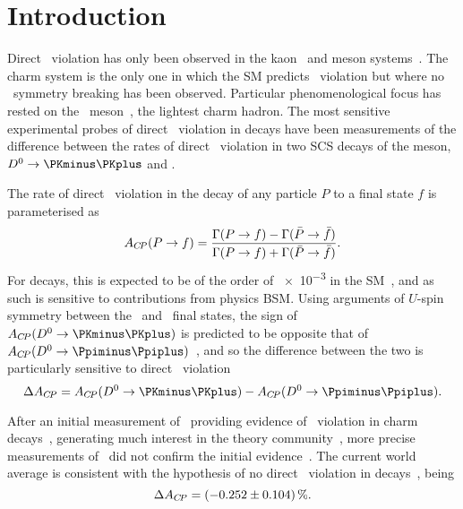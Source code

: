 \chapter{Introduction}
\label{chap:cpv:introduction}

Direct \CP\ violation has only been observed in the
kaon~\cite{Christenson:1964fg,Batley:2002gn} and \PB meson
systems~\cite{Aubert:2001nu,Abe:2001xe,Aaij:2012kz,Aaij:2013iua}.
The charm system is the only one in which the \ac{SM} predicts \CP\ violation
but where no \CP\ symmetry breaking has been observed.
Particular phenomenological focus has rested on the \PDzero\
meson~\cite{Grossman:2006jg}, the lightest charm hadron.
The most sensitive experimental probes of direct \CP\ violation in \PDzero
decays have been measurements of the difference between the rates of direct
\CP\ violation in two \ac{SCS} decays of the \PDzero meson,
$\decay{\PDzero}{\KmKp}$ and \pimpip.

The rate of direct \CP\ violation in the decay of any particle $P$ to a final
state $f$ is parameterised as
\begin{equation}
  \ACP(\decay{P}{f}) = \frac{%
    \Gamma(\decay{P}{f}) - \Gamma(\decay{\bar{P}}{\bar{f}})
  }{%
    \Gamma(\decay{P}{f}) + \Gamma(\decay{\bar{P}}{\bar{f}})
  }.
  \label{eqn:cpv:introduction:acp}
\end{equation}
For \decay{\PDzero}{\hmhp} decays, this is expected to be of the order of
\num{e-3} in the \ac{SM}~\cite{Grossman:2006jg}, and as such is sensitive to
contributions from physics \acl{BSM}.
Using arguments of $U$-spin symmetry between the \KmKp\ and \pimpip\ final
states, the sign of $\ACP(\decay{\PDzero}{\KmKp})$ is predicted to be opposite
that of $\ACP(\decay{\PDzero}{\pimpip})$~\cite{Grossman:2006jg}, and so the
difference between the two is particularly sensitive to direct \CP\ violation
\begin{equation}
  \dACP = \ACP(\decay{\PDzero}{\KmKp}) - \ACP(\decay{\PDzero}{\pimpip}).
  \label{eqn:cpv:introduction:dacp_pure}
\end{equation}

After an initial measurement of \dACP\ providing evidence of \CP\ violation in
charm decays~\cite{Aaij:2011in,Lenz:2013pwa}, generating much interest in the
theory community~\cite{Lenz:2013pwa}, more precise measurements of \dACP\ did
not confirm the initial evidence~\cite{Aaij:2014gsa,Aaij:2016cfh}.
The current world average is consistent with the hypothesis of no direct \CP\
violation in \PDzero decays~\cite{Amhis:2014hma}, being\footnotemark
\begin{equation}
  \dACP = \SI{-0.252 \pm 0.104}{\percent}.
  \label{eqn:cpv:introduction:dacp_world_average}
\end{equation}

